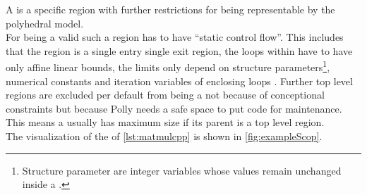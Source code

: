 A \scop is a specific region with further restrictions for being representable by the polyhedral model.\\
For being a valid \scop such a region has to have \enquote{static control flow}.
This includes that the region is a single entry single exit region, the loops within have to have only affine linear bounds, \eg the limits only depend on structure parameters\footnote{Structure parameter are integer variables whose values remain unchanged inside a \scop.}, numerical constants and iteration variables of enclosing loops \cite{GanserIterativeSchedule}. %
Further top level regions are excluded per default from being a \scop not because of conceptional constraints but because Polly needs a safe space to put code for maintenance.
This means a \scop usually has maximum size if its parent is a top level region.\\
The visualization of the \scops of \autoref{lst:matmulcpp} is shown in \autoref{fig:exampleScop}.
